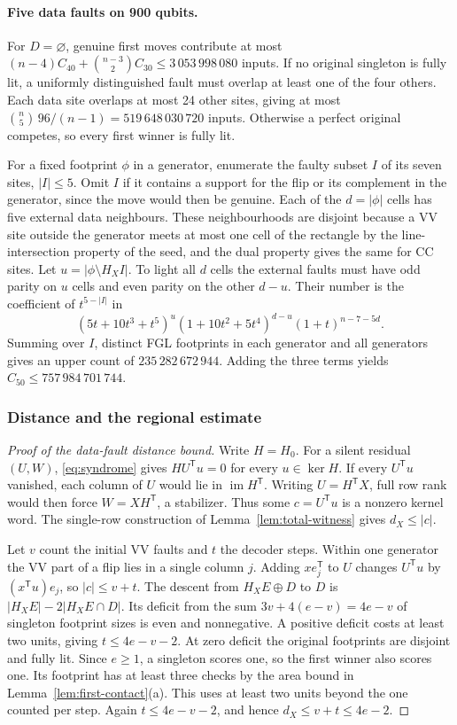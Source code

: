 \documentclass[10pt,twocolumn]{article}
\theoremstyle{definition}
\DeclareMathOperator{\im}{im}
\begin{document}
\paragraph{Five data faults on 900 qubits.}
For $D=\varnothing$, genuine first moves contribute at most
$(n-4)C_{40}+\binom{n-3}{2}C_{30}\le3\,053\,998\,080$ inputs.
If no original singleton is fully lit, a uniformly distinguished fault
must overlap at least one of the four others. Each data site overlaps
at most 24 other sites, giving at most
$\binom n5\,96/(n-1)=519\,648\,030\,720$ inputs. Otherwise a perfect
original competes, so every first winner is fully lit.

For a fixed footprint $\phi$ in a generator, enumerate the faulty
subset $I$ of its seven sites, $|I|\le5$. Omit $I$ if it contains a
support for the flip or its complement in the generator, since the
move would then be genuine. Each of the $d=|\phi|$ cells has five
external data neighbours. These neighbourhoods are disjoint because a VV
site outside the generator meets at most one cell of the rectangle
by the line-intersection property of the seed, and the dual property
gives the same for CC sites. Let $u=|\phi\setminus H_X I|$. To light
all $d$ cells the external faults must have odd parity on $u$ cells
and even parity on the other $d-u$. Their number is the coefficient
of $t^{5-|I|}$ in
\[
 (5t+10t^3+t^5)^u(1+10t^2+5t^4)^{d-u}
 (1+t)^{n-7-5d}.
\]
Summing over $I$, distinct FGL footprints in each generator and all
generators gives an upper count of $235\,282\,672\,944$. Adding the
three terms yields $C_{50}\le757\,984\,701\,744$.

\subsubsection{Distance and the regional estimate}\label{app:sector-bounds}
\begin{proof}[Proof of the data-fault distance bound]
Write $H=H_0$. For a silent residual $(U,W)$, \eqref{eq:syndrome}
gives $HU^{\mathsf T}u=0$ for every $u\in\ker H$. If every
$U^{\mathsf T}u$ vanished, each column of $U$ would lie in
$\im H^{\mathsf T}$. Writing $U=H^{\mathsf T}X$, full row rank
would then force $W=XH^{\mathsf T}$, a stabilizer. Thus some
$c=U^{\mathsf T}u$ is a nonzero kernel word. The single-row
construction of Lemma~\ref{lem:total-witness} gives $d_X\le|c|$.

Let $v$ count the initial VV faults and $t$ the decoder steps. Within
one generator the VV part of a flip lies in a single column $j$.
Adding $x e_j^{\mathsf T}$ to $U$ changes $U^{\mathsf T}u$ by
$(x^{\mathsf T}u)e_j$, so $|c|\le v+t$. The descent from
$H_XE\oplus D$ to $D$ is $|H_XE|-2|H_XE\cap D|$.
Its deficit from the sum $3v+4(e-v)=4e-v$ of singleton footprint
sizes is even and nonnegative. A positive deficit costs at least two
units, giving $t\le4e-v-2$. At zero deficit the original footprints
are disjoint and fully lit. Since $e\ge1$, a singleton scores one,
so the first winner also scores one. Its footprint has at least three
checks by the area bound in Lemma~\ref{lem:first-contact}(a). This
uses at least two units beyond the one counted per step. Again $t\le4e-v-2$,
and hence $d_X\le v+t\le4e-2$.
\end{proof}
\end{document}
